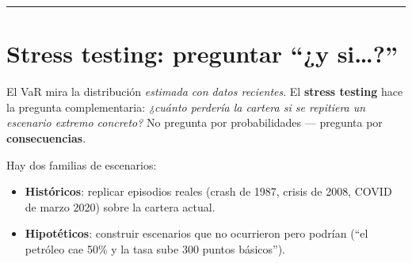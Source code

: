 \documentclass[
  spanish,
  letterpaper,
  DIV=11,
  numbers=noendperiod]{scrreprt}
\providecommand{\tightlist}{%
  \setlength{\itemsep}{0pt}\setlength{\parskip}{0pt}}
\begin{document}
\begin{center}\rule{0.5\linewidth}{0.5pt}\end{center}

\chapter{Stress testing: preguntar ``¿y
si\ldots?''}\label{stress-testing-preguntar-y-si}

El VaR mira la distribución \emph{estimada con datos recientes}. El
\textbf{stress testing} hace la pregunta complementaria: \emph{¿cuánto
perdería la cartera si se repitiera un escenario extremo concreto?} No
pregunta por probabilidades --- pregunta por \textbf{consecuencias}.

Hay dos familias de escenarios:

\begin{itemize}
\tightlist
\item
  \textbf{Históricos}: replicar episodios reales (crash de 1987, crisis
  de 2008, COVID de marzo 2020) sobre la cartera actual.
\item
  \textbf{Hipotéticos}: construir escenarios que no ocurrieron pero
  podrían (``el petróleo cae 50\% y la tasa sube 300 puntos básicos'').
\end{itemize}
\end{document}
